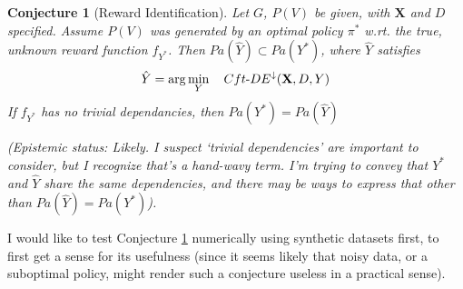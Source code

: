 \documentclass[letterpaper,10pt]{article}
\newtheorem{conjecture}{Conjecture}
\begin{document}
\begin{conjecture}[Reward Identification]\label{decomp-conj}
Let $G$, $P(V)$ be given, with $\mathbf{X}$ and $D$ specified. Assume $P(V)$ was generated by an optimal policy $\pi^*$ w.rt. the true, unknown reward function $f_{Y^*}$. Then $Pa(\hat{Y})\subset Pa(Y^*)$, where $\hat{Y}$ satisfies
\[
\hat{Y} = \arg \min_Y \quad Cft{\text -}DE^\downarrow(\mathbf{X},D,Y)
\]
If $f_{Y^*}$ has no trivial dependancies, then $Pa(Y^*)=Pa(\hat{Y})$

(Epistemic status: Likely.
I suspect `trivial dependencies' are important to consider, but I recognize that's a hand-wavy term. I'm trying to convey that $Y^*$ and $\hat{Y}$ share the same dependencies, and there may be ways to express that other than $Pa(\hat{Y})=Pa(Y^*)$).
\end{conjecture}

I would like to test Conjecture \ref{decomp-conj} numerically using synthetic datasets first, to first get a sense for its usefulness (since it seems likely that noisy data, or a suboptimal policy, might render such a conjecture useless in a practical sense).




\end{document}
